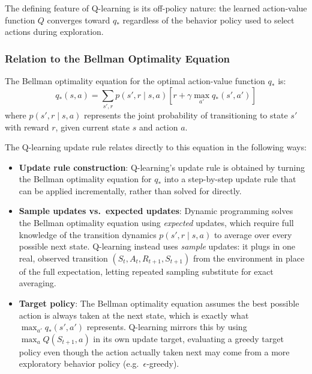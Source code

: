 \documentclass{scrartcl}
\theoremstyle{mytheoremstyle}
\theoremstyle{mytheoremstyle}
\theoremstyle{myproblemstyle}
\begin{document}
The defining feature of Q-learning is its off-policy nature: the learned action-value function $Q$
converges toward $q_*$ regardless of the behavior policy used to select actions during exploration.

\subsubsection{Relation to the Bellman Optimality Equation}

The Bellman optimality equation for the optimal action-value function $q_*$ is:
\[
    q_*(s, a) = \sum_{s', r} p(s', r \mid s, a) \left[ r + \gamma \max_{a'} q_*(s', a') \right]
\]
where $p(s', r \mid s, a)$ represents the joint probability of transitioning to state $s'$ with reward
$r$, given current state $s$ and action $a$.

The Q-learning update rule relates directly to this equation in the following ways:

\begin{itemize}
    \item \textbf{Update rule construction}: Q-learning's update rule is obtained by turning the Bellman
          optimality equation for $q_*$ into a step-by-step update rule that can be applied incrementally,
          rather than solved for directly.

    \item \textbf{Sample updates vs.\ expected updates}: Dynamic programming solves the Bellman
          optimality equation using \emph{expected} updates, which require full knowledge of the transition
          dynamics $p(s', r \mid s, a)$ to average over every possible next state. Q-learning instead uses
          \emph{sample} updates: it plugs in one real, observed transition $(S_t, A_t, R_{t+1}, S_{t+1})$ from
          the environment in place of the full expectation, letting repeated sampling substitute for exact
          averaging.

    \item \textbf{Target policy}: The Bellman optimality equation assumes the best possible action is
          always taken at the next state, which is exactly what $\max_{a'} q_*(s', a')$ represents. Q-learning
          mirrors this by using $\max_a Q(S_{t+1}, a)$ in its own update target, evaluating a greedy target
          policy even though the action actually taken next may come from a more exploratory behavior policy
          (e.g.\ $\epsilon$-greedy).
\end{itemize}
\end{document}
